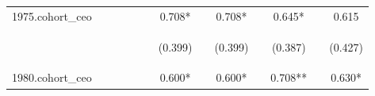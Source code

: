 \begin{center}
\begin{tabular}{lcccccccccccc}
1975.cohort\_ceo &  &  &  &  &  & 0.708* &  & 0.708* &  & 0.645* &  & 0.615 \\
\vspace{4pt} & \begin{footnotesize}\end{footnotesize} & \begin{footnotesize}\end{footnotesize} & \begin{footnotesize}\end{footnotesize} & \begin{footnotesize}\end{footnotesize} & \begin{footnotesize}\end{footnotesize} & \begin{footnotesize}(0.399)\end{footnotesize} & \begin{footnotesize}\end{footnotesize} & \begin{footnotesize}(0.399)\end{footnotesize} & \begin{footnotesize}\end{footnotesize} & \begin{footnotesize}(0.387)\end{footnotesize} & \begin{footnotesize}\end{footnotesize} & \begin{footnotesize}(0.427)\end{footnotesize} \\
1980.cohort\_ceo &  &  &  &  &  & 0.600* &  & 0.600* &  & 0.708** &  & 0.630* \\

\end{tabular}
\end{center}
